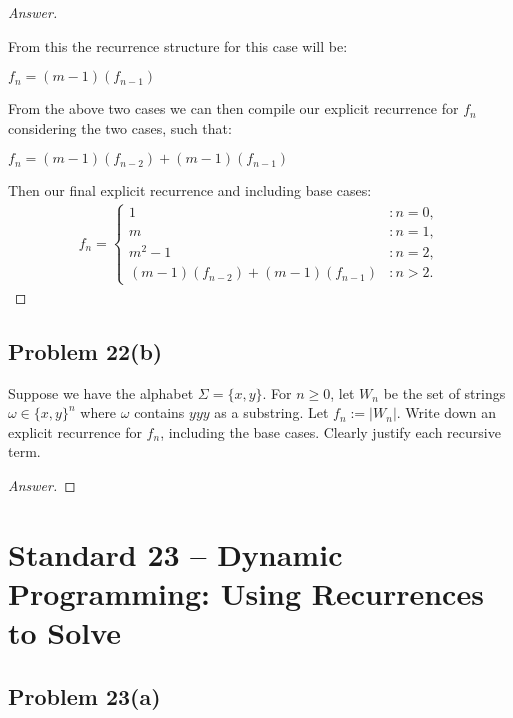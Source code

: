 \documentclass[11pt]{article}
\theoremstyle{definition}
\theoremstyle{definition}
\theoremstyle{definition}
\begin{document}
\begin{proof}[Answer]
\begin{itemize}
From this the recurrence structure for this case will be: \\
\begin{center}
$f_n = (m-1)(f_{n-1})$
\end{center}
\end{itemize}

From the above two cases we can then compile our explicit recurrence for $f_n$ considering the two cases, such that: \\
\begin{center}
$f_n = (m-1)(f_{n-2}) + (m-1)(f_{n-1})$
\end{center}
Then our final explicit recurrence and including base cases: \\
\begin{align*}
f_n = \begin{cases}
1 & : n = 0, \\
m & : n = 1, \\
m^2 - 1 & : n = 2, \\
(m-1)(f_{n-2}) + (m-1)(f_{n-1}) & : n > 2.
\end{cases}
\end{align*}
\end{proof}

\newpage
\subsection*{Problem 22(b)}

Suppose we have the alphabet $\Sigma = \{x, y\}$. For $n \geq 0$, let $W_{n}$ be the set of strings $\omega \in \{x, y\}^{n}$ where $\omega$ contains $yyy$ as a substring. Let $f_{n} := |W_{n}|$. Write down an explicit recurrence for $f_{n}$, including the base cases. Clearly justify each recursive term.

\begin{proof}[Answer]
\end{proof}

\newpage
\section{Standard 23 -- Dynamic Programming: Using Recurrences to Solve}

\subsection*{Problem 23(a)}
\end{document}
